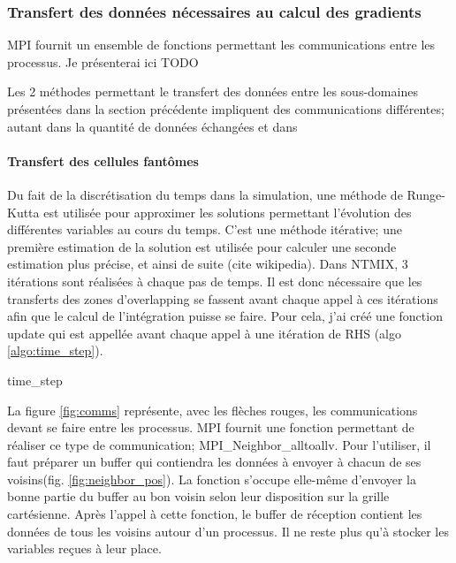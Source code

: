 \subsubsection{Transfert des données nécessaires au calcul des gradients}
MPI fournit un ensemble de fonctions permettant les communications entre les processus. Je présenterai ici 
TODO

Les 2 méthodes permettant le transfert des données entre les sous-domaines présentées dans la section précédente impliquent des communications différentes; autant dans la quantité de données échangées et dans 

\paragraph{Transfert des cellules fantômes}
Du fait de la discrétisation du temps dans la simulation, une méthode de Runge-Kutta est utilisée pour approximer les solutions permettant l'évolution des différentes variables au cours du temps. C'est une méthode itérative; une première estimation de la solution est utilisée pour calculer une seconde estimation plus précise, et ainsi de suite (cite wikipedia). Dans NTMIX, 3 itérations sont réalisées à chaque pas de temps.
Il est donc nécessaire que les transferts des zones d'overlapping se fassent avant chaque appel à ces itérations afin que le calcul de l'intégration puisse se faire. Pour cela, j'ai créé une fonction update qui est appellée avant chaque appel à une itération de RHS (algo \ref{algo:time_step}).

\begin{algorithm}
  \caption{time\_step}
  \label{algo:time_step}
  \begin{algorithmic}
  \end{algorithmic}
\end{algorithm}


La figure \ref{fig:comms} représente, avec les flèches rouges, les communications devant se faire entre les processus. MPI fournit une fonction permettant de réaliser ce type de communication; MPI\_Neighbor\_alltoallv. Pour l'utiliser, il faut préparer un buffer qui contiendra les données à envoyer à chacun de ses voisins(fig. \ref{fig:neighbor_pos}). La fonction s'occupe elle-même d'envoyer la bonne partie du buffer au bon voisin selon leur disposition sur la grille cartésienne. Après l'appel à cette fonction, le buffer de réception contient les données de tous les voisins autour d'un processus. Il ne reste plus qu'à stocker les variables reçues à leur place. 



